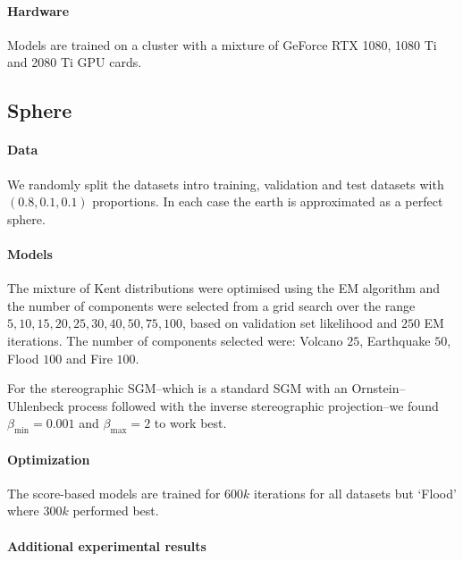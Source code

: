 \paragraph{Hardware}
Models are trained on a cluster with a mixture of GeForce RTX 1080, 1080 Ti and 2080 Ti GPU cards.

\subsection{Sphere}
\paragraph{Data}

We randomly split the datasets intro training, validation and test datasets with $(0.8, 0.1, 0.1)$ proportions.
In each case the earth is approximated as a perfect sphere.

\paragraph{Models}
The mixture of Kent distributions \parencite{peel2001fitting} were optimised using the EM algorithm and the number of components were selected from a grid search over the range $5, 10, 15, 20, 25, 30, 40, 50, 75, 100$, based on validation set likelihood and $250$ EM iterations.
The number of components selected were: Volcano $25$, Earthquake $50$, Flood $100$ and Fire $100$.

For the stereographic SGM--which is a standard SGM with an Ornstein–Uhlenbeck process followed with the inverse stereographic projection--we found $\beta_{\min}=0.001$ and $\beta_{\max}=2$ to work best.

\paragraph{Optimization}
The score-based models are trained for $600k$ iterations for all datasets but `Flood' where $300k$ performed best.

\paragraph{Additional experimental results}

